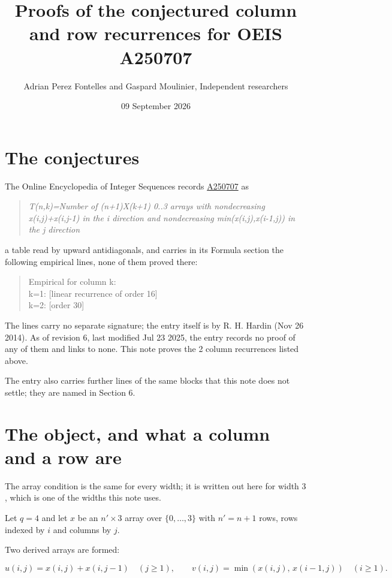 \documentclass[11pt]{article}
\title{Proofs of the conjectured column and row recurrences for OEIS A250707}
\author{Adrian Perez Fontelles and Gaspard Moulinier, Independent researchers}
\date{09 September 2026}
\theoremstyle{definition}
\begin{document}
\maketitle
\section{The conjectures}

The Online Encyclopedia of Integer Sequences records \href{https://oeis.org/A250707}{A250707} as

\begin{quote}\itshape T(n,k)=Number of (n+1)X(k+1) 0..3 arrays with nondecreasing x(i,j)+x(i,j-1) in the i direction and nondecreasing min(x(i,j),x(i-1,j)) in the j direction\end{quote}

a table read by upward antidiagonals, and carries in its Formula section the following empirical lines, none of them proved there:

\begin{quote}\ttfamily Empirical for column k:\\
k=1: [linear recurrence of order 16]\\k=2: [order 30]\end{quote}

The lines carry no separate signature; the entry itself is by R. H. Hardin (Nov 26 2014). As of revision 6, last modified Jul 23 2025, the entry records no proof of any of them and links to none. This note proves the 2 column recurrences listed above.

The entry also carries further lines of the same blocks that this note does not settle; they are named in Section 6.

\section{The object, and what a column and a row are}

The array condition is the same for every width; it is written out here for width $3$, which is one of the widths this note uses.

Let $q = 4$ and let $x$ be an $n' \times 3$ array over $\{0,\dots,3\}$ with $n' = n + 1$ rows, rows indexed by $i$ and columns by $j$.

Two derived arrays are formed:

\[u(i,j) = x(i,j) + x(i,j{-}1)\quad (j \ge 1), \qquad v(i,j) = \min(x(i,j),\,x(i{-}1,j))\quad (i \ge 1).\]
\end{document}
